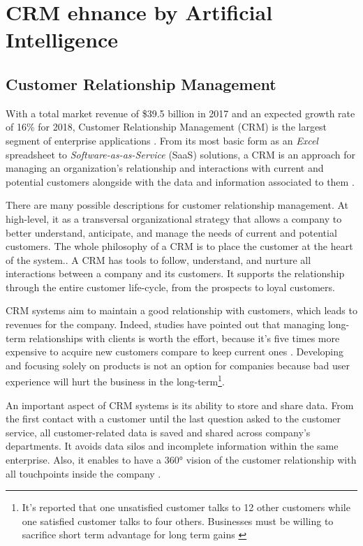 \chapter{CRM ehnance by Artificial Intelligence}
\label{sec:crm-ai}


\section{Customer Relationship Management}

With a total market revenue of \$39.5 billion in 2017 and an expected growth rate of 16\% for 2018, Customer Relationship Management (CRM) is the largest segment of enterprise applications \cite{gartner-crm-market}. From its most basic form as an \textit{Excel} spreadsheet to \textit{Software-as-as-Service} (SaaS) solutions, a CRM is an approach for managing an organization's relationship and interactions with current and potential customers alongside with the data and information associated to them \cite{salesforce:CRM-def}.

There are many possible descriptions for customer relationship management. At high-level, it as a transversal organizational strategy that allows a company to better understand, anticipate, and manage the needs of current and potential customers. The whole philosophy of a CRM is to place the customer at the heart of the system.\cite{brown2000customer}\nocite{biedermann-crm}. A CRM has tools to follow, understand, and nurture all interactions between a company and its customers. It supports the relationship through the entire customer life-cycle, from the prospects to loyal customers. 

CRM systems aim to maintain a good relationship with customers, which leads to revenues for the company. Indeed, studies have pointed out that managing long-term relationships with clients is worth the effort, because it's five times more expensive to acquire new customers compare to keep current ones \cite{crm-facts}. Developing and focusing solely on products is not an option for companies because bad user experience will hurt the business in the long-term\footnote{It's reported that one unsatisfied customer talks to 12 other customers while one satisfied customer talks to four others. Businesses must be willing to sacrifice short term advantage for long term gains \cite{crm-facts,bennet,crm-essay}}.

An important aspect of CRM systems is its ability to store and share data. From the first contact with a customer until the last question asked to the customer service, all customer-related data is saved and shared across company's departments. It avoids data silos and incomplete information within the same enterprise. Also, it enables to have a 360° vision of the customer relationship with all touchpoints inside the company \cite{efficy-crm}.

